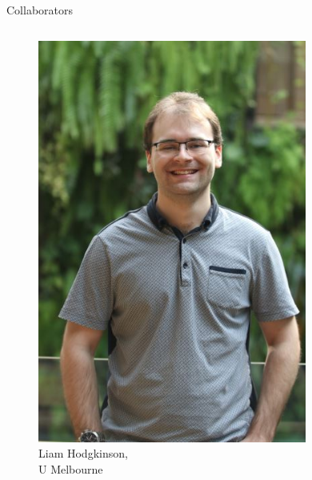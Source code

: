 \begin{frame}{Collaborators}
    \begin{columns}[c]
    \begin{column}{0.24\textwidth}
    \begin{figure}
        \centering
        \includegraphics[width=\textwidth,clip,trim={0 7cm 0 0}]{Figures/intro/liam.jpg}
        \caption{\tiny Liam Hodgkinson,\\U Melbourne}
    \end{figure}
    \end{column}
    \begin{column}{0.24\textwidth}
    \begin{figure}
        \centering

\end{figure}
\end{column}
\end{columns}
\end{frame}
